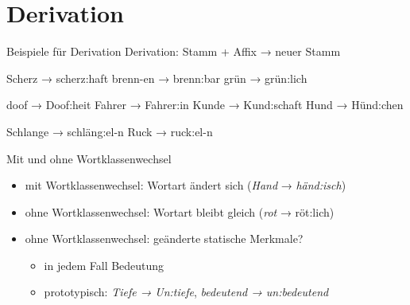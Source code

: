 \section{Derivation}

\begin{frame}
  {Beispiele für Derivation}
  \pause
  Derivation: \alert{Stamm + Affix → neuer Stamm}
  \Halbzeile
  \pause
  \begin{exe}
    \ex
    \begin{xlist}
      \ex Scherz → scherz\alert{:haft}
      \pause
      \ex brenn-en → brenn\alert{:bar}
      \pause
      \ex grün → grün\alert{:lich}
    \end{xlist}
    \pause
    \Halbzeile
    \ex
    \begin{xlist}
      \ex doof → Doof\alert{:heit}
      \pause
      \ex Fahrer → Fahrer\alert{:in}
      \pause
      \ex Kunde → Kund\alert{:schaft}
      \pause
      \ex Hund → Hünd\alert{:chen}
    \end{xlist}
    \pause
    \Halbzeile
    \ex
    \begin{xlist}
      \ex Schlange → schläng\alert{:el}-n
      \pause
      \ex Ruck → ruck\alert{:el}-n
    \end{xlist}
  \end{exe}
\end{frame}

\begin{frame}
  {Mit und ohne Wortklassenwechsel}
  \pause
  \begin{itemize}[<+->]
    \item \alert{mit} Wortklassenwechsel: Wortart ändert sich (\textit{Hand} → \textit{händ:isch})
    \item \alert{ohne} Wortklassenwechsel: Wortart bleibt gleich (\textit{rot} → röt:lich)
      \Zeile
    \item ohne Wortklassenwechsel: geänderte statische Merkmale?
      \begin{itemize}[<+->]
        \item in jedem Fall \alert{Bedeutung}
        \item prototypisch: \textit{Tiefe → Un:tiefe}, \textit{bedeutend → un:bedeutend}
      \end{itemize}
  \end{itemize}
\end{frame}

